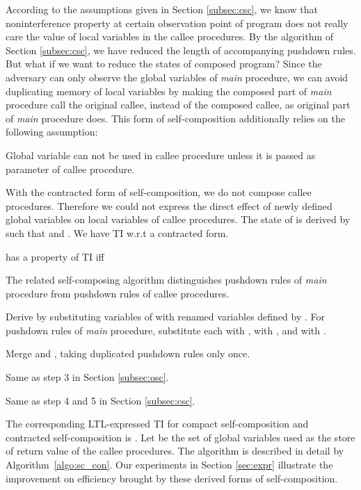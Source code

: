 \documentclass{llncs}
\begin{document}
According to the assumptions given in Section \ref{subsec:csc}, we
know that noninterference property at certain observation point of
program does not really care the value of local variables in the
callee procedures. By the algorithm of Section \ref{subsec:csc}, we
have reduced the length of  accompanying pushdown rules. But what
if we want to reduce the states of composed program? Since the
adversary can only observe the global variables of \emph{main}
procedure, we can avoid duplicating memory of local variables by
making the composed part of \emph{main} procedure call the original
callee, instead of the composed callee, as original part of
\emph{main} procedure does. This form of self-composition
additionally relies on the following assumption:
\begin{compactitem}
\item Global variable can not be used in callee procedure unless
it is passed as parameter of callee procedure.
\end{compactitem}
With the contracted form of self-composition, we do not compose
callee procedures. Therefore we could not express the direct effect
of newly defined global variables on local variables of callee
procedures. The state of  is derived by
 such that  and
. We have TI w.r.t a contracted form.
\begin{definition}
 has a property of
TI iff\\
\hspace*{\fill}\hspace*{\fill}
\end{definition}
\indent The related self-composing algorithm distinguishes pushdown
rules of \emph{main} procedure from pushdown rules of callee
procedures.
\begin{compactenum}
\item Derive  by substituting variables of
 with renamed variables defined by . For pushdown
rules of \emph{main} procedure, substitute each  with ,  with , and
 with
.
\item Merge  and , taking duplicated
pushdown rules only once.
\item Same as step 3 in Section \ref{subsec:osc}.
\item Same as step 4 and 5 in Section \ref{subsec:csc}.
\end{compactenum}
\indent The corresponding LTL-expressed TI for compact
self-composition and contracted self-composition is . Let  be the set of global variables used as the store
of return value of the callee procedures. The algorithm is described
in detail by Algorithm~\ref{algo:sc_con}. Our experiments in Section
\ref{sec:expr} illustrate the improvement on efficiency brought by
these derived forms of self-composition.
\end{document}

